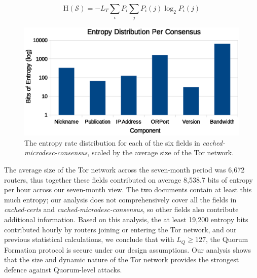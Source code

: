 \documentclass{sig-alternate}
\begin{document}
\begin{equation}
\mathrm{H}(\mathcal{S}) = - L_{T} \sum_{i} P_{i} \sum_{j} P_{i}(j) \log_{2}P_{i}(j)
\label{eq:entropyRate}
\end{equation}

\begin{figure}[h]
	\centering
	\includegraphics[width=\linewidth]{../analysis/EntropyDistribution.eps}
	\caption{The entropy rate distribution for each of the six fields in \emph{cached-microdesc-consensus}, scaled by the average size of the Tor network.}
	\label{fig:entropyRates}
\end{figure}

The average size of the Tor network across the seven-month period was 6,672 routers, thus together these fields contributed on average 8,538.7 bits of entropy per hour across our seven-month view. The two documents contain at least this much entropy; our analysis does not comprehensively cover all the fields in \emph{cached-certs} and \emph{cached-microdesc-consensus}, so other fields also contribute additional information. Based on this analysis, the at least 19,200 entropy bits contributed hourly by routers joining or entering the Tor network, and our previous statistical calculations, we conclude that with $ L_{Q} \geq 127 $, the Quorum Formation protocol is secure under our design assumptions. Our analysis shows that the size and dynamic nature of the Tor network provides the strongest defence against Quorum-level attacks. 

\end{document}
